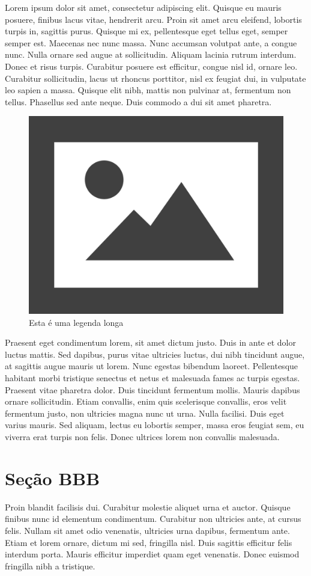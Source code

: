 \documentclass{article}
\begin{document}
	Lorem ipsum dolor sit amet, consectetur adipiscing elit. Quisque eu mauris posuere, finibus lacus vitae, hendrerit arcu. Proin sit amet arcu eleifend, lobortis turpis in, sagittis purus. Quisque mi ex, pellentesque eget tellus eget, semper semper est. Maecenas nec nunc massa. Nunc accumsan volutpat ante, a congue nunc. Nulla ornare sed augue at sollicitudin. Aliquam lacinia rutrum interdum. Donec et risus turpis. Curabitur posuere est efficitur, congue nisl id, ornare leo. Curabitur sollicitudin, lacus ut rhoncus porttitor, nisl ex feugiat dui, in vulputate leo sapien a massa. Quisque elit nibh, mattis non pulvinar at, fermentum non tellus. Phasellus sed ante neque. Duis commodo a dui sit amet pharetra.
	
	\begin{figure}[H]
		\centering
		\includegraphics[width=0.3\linewidth]{Figuras/fig1}
		\caption[Legenda curta]{Esta é uma legenda longa}
		\label{fig:fig1}
	\end{figure}
	
	Praesent eget condimentum lorem, sit amet dictum justo. Duis in ante et dolor luctus mattis. Sed dapibus, purus vitae ultricies luctus, dui nibh tincidunt augue, at sagittis augue mauris ut lorem. Nunc egestas bibendum laoreet. Pellentesque habitant morbi tristique senectus et netus et malesuada fames ac turpis egestas. Praesent vitae pharetra dolor. Duis tincidunt fermentum mollis. Mauris dapibus ornare sollicitudin. Etiam convallis, enim quis scelerisque convallis, eros velit fermentum justo, non ultricies magna nunc ut urna. Nulla facilisi. Duis eget varius mauris. Sed aliquam, lectus eu lobortis semper, massa eros feugiat sem, eu viverra erat turpis non felis. Donec ultrices lorem non convallis malesuada.
	
	\section{Seção BBB}
	
	
	Proin blandit facilisis dui. Curabitur molestie aliquet urna et auctor. Quisque finibus nunc id elementum condimentum. Curabitur non ultricies ante, at cursus felis. Nullam sit amet odio venenatis, ultricies urna dapibus, fermentum ante. Etiam et lorem ornare, dictum mi sed, fringilla nisl. Duis sagittis efficitur felis interdum porta. Mauris efficitur imperdiet quam eget venenatis. Donec euismod fringilla nibh a tristique.
	
\end{document}
